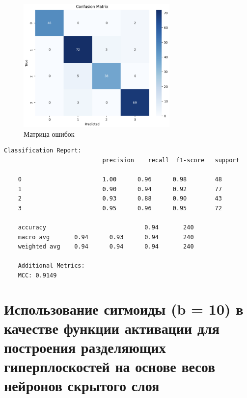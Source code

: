 \begin{figure}
	\begin{center}
		\includegraphics[width=0.7\textwidth]{images/9.png}
	\end{center}
	\caption{Матрица ошибок}
	\label{img:9}
\end{figure}

\begin{lstlisting}[label=lst:4,caption=Отчёт по результатам классификации]
	Classification Report:
							precision    recall  f1-score   support
	
	0       				1.00      0.96      0.98        48
	1       				0.90      0.94      0.92        77
	2       				0.93      0.88      0.90        43
	3       				0.95      0.96      0.95        72
	
	accuracy                           	0.94       240
	macro avg       0.94      0.93      0.94       240
	weighted avg    0.94      0.94      0.94       240
	
	Additional Metrics:
	MCC: 0.9149
\end{lstlisting}

\clearpage

\section{Использование сигмоиды (b = 10) в качестве функции активации для построения разделяющих гиперплоскостей на основе весов нейронов скрытого слоя}

